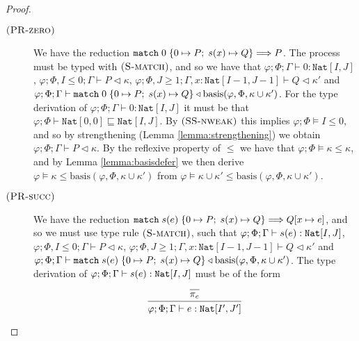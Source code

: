 \begin{theorem}
\begin{proof}
\begin{description}
    \item[$\mbox{\textsc{\protect{(PR-zero})}}$] We have the reduction $\texttt{match}\; 0\; \{ 0 \mapsto P;\; s(x) \mapsto Q \} \Longrightarrow P$. The process must be typed with $\mbox{\textsc{\protect{(S-match})}}$, and so we have that $\varphi;\Phi;\Gamma\vdash 0 : \texttt{Nat}[I,J]$, $\varphi;\Phi,I\leq 0;\Gamma\vdash P \triangleleft \kappa$, $\varphi;\Phi,J\geq 1;\Gamma,x:\texttt{Nat}[I-1,J-1]\vdash Q \triangleleft \kappa'$ and $\varphi;\Phi;\Gamma\vdash \texttt{match}\; 0\; \{ 0 \mapsto P;\; s(x) \mapsto Q \} \triangleleft \text{basis}(\varphi,\Phi,\kappa\cup\kappa')$. For the type derivation of $\varphi;\Phi;\Gamma\vdash 0 : \texttt{Nat}[I,J]$ it must be that $\varphi;\Phi\vdash \texttt{Nat}[0,0] \sqsubseteq \texttt{Nat}[I,J]$. By $\mbox{\textsc{\protect{(SS-nweak})}}$ this implies $\varphi;\Phi\vDash I \leq 0$, and so by strengthening (Lemma \ref{lemma:strengthening}) we obtain $\varphi;\Phi;\Gamma\vdash P \triangleleft \kappa$. By the reflexive property of $\leq$ we have that $\varphi;\Phi\vDash \kappa \leq \kappa$, and by Lemma \ref{lemma:basisdefer} we then derive $\varphi\vDash \kappa \leq \text{basis}(\varphi,\Phi,\kappa\cup\kappa')$ from $\varphi\vDash \kappa\cup\kappa'\leq \text{basis}(\varphi,\Phi,\kappa\cup\kappa')$. 
    \item[$\mbox{\textsc{\protect{(PR-succ})}}$] We have the reduction $\texttt{match}\; s(e)\; \{ 0 \mapsto P;\; s(x) \mapsto Q \} \Longrightarrow Q[x\mapsto e]$, and so we must use type rule $\mbox{\textsc{\protect{(S-match})}}$, such that $\varphi;\Phi;\Gamma\vdash s(e) : \texttt{Nat}[I,J]$, $\varphi;\Phi,I\leq 0;\Gamma\vdash P \triangleleft \kappa$, $\varphi;\Phi,J\geq 1;\Gamma,x:\texttt{Nat}[I-1,J-1]\vdash Q \triangleleft \kappa'$ and $\varphi;\Phi;\Gamma\vdash \texttt{match}\; s(e)\; \{ 0 \mapsto P;\; s(x) \mapsto Q \} \triangleleft \text{basis}(\varphi,\Phi,\kappa\cup\kappa')$. The type derivation of $\varphi;\Phi;\Gamma\vdash s(e) : \texttt{Nat}[I,J]$ must be of the form
    \begin{align*}
        \begin{prooftree}
        \Infer0{\pi_e}
        \Infer1{\varphi;\Phi;\Gamma\vdash e : \texttt{Nat}[I',J']}

\end{prooftree}
\end{align*}
\end{description}
\end{proof}
\end{theorem}
